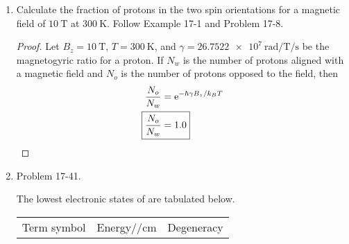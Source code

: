 \documentclass[../psets.tex]{subfiles}
\begin{document}
\begin{enumerate}
\begin{enumerate}
\begin{proof}
\begin{align*}
                x_\text{CM} &= \frac{\sum_{i=1}^3m_ix_i}{\sum_{i=1}^3m_i}\\
                \Aboxed{x_\text{CM} &= \SI{9.355}{\pico\meter}}
            \end{align*}
            It follows that the moment of inertia about an axis perpendicular to the bond axis is
            \begin{align*}
                I_B &= \sum_{i=1}^3m_ix_i^2\\
                &= m_1(x_1+x_\text{CM})^2+m_2x_\text{CM}^2+m_3(x_3-x_\text{CM})^2\\
                \Aboxed{I_B &= \SI{6.727e-46}{\kilo\gram\meter\squared}}
            \end{align*}
            Thus, our calculated rotational temperature is
            \begin{equation*}
                \Theta_\text{rot} = \frac{\hbar^2}{2I_Bk_B}
                = \SI{0.5985}{\kelvin}
            \end{equation*}
            which has percent error of $0.829\%$ from $\SI{0.603}{\kelvin}$, the value from Table 18.4.
        \end{proof}
        \item Calculate the fraction of protons in the two spin orientations for a magnetic field of $\SI{10}{\tesla}$ at $\SI{300}{\kelvin}$. Follow Example 17-1 and Problem 17-8.
        \begin{proof}
            Let $B_z=\SI{10}{\tesla}$, $T=\SI{300}{\kelvin}$, and $\gamma=\SI{26.7522e7}{\radian\per\tesla\per\second}$ be the magnetogyric ratio for a proton. If $N_w$ is the number of protons aligned with a magnetic field and $N_o$ is the number of protons opposed to the field, then
            \begin{align*}
                \frac{N_o}{N_w} &= \e[-\hbar\gamma B_z/k_BT]\\
                \Aboxed{\frac{N_o}{N_w} &= 1.0}
            \end{align*}
        \end{proof}
        \item Problem 17-41.\par
        The lowest electronic states of  are tabulated below.
        \begin{center}
            \small
            \renewcommand{\arraystretch}{1.2}
            \begin{tabular}{cS[table-format=5.3]c}
                Term symbol & {Energy/$\si{\per\centi\meter}$} & Degeneracy\\

\end{tabular}
\end{center}
\end{enumerate}
\end{enumerate}
\end{document}
